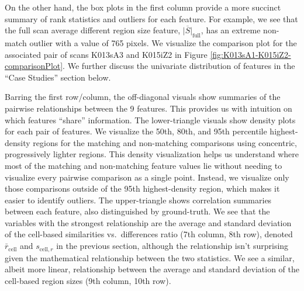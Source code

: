 \documentclass[11pt,]{isuthesis}
\begin{document}
On the other hand, the box plots in the first column provide a more succinct summary of rank statistics and outliers for each feature.
For example, we see that the full scan average different region size feature, \(\overline{|S|}_{\text{full}}\), has an extreme non-match outlier with a value of 765 pixels.
We visualize the comparison plot for the associated pair of scans K013sA3 and K015iZ2 in Figure \ref{fig:K013sA1-K015iZ2-comparisonPlot}.
We further discuss the univariate distribution of features in the ``Case Studies'' section below.

Barring the first row/column, the off-diagonal visuals show summaries of the pairwise relationships between the 9 features.
This provides us with intuition on which features ``share'' information.
The lower-triangle visuals show density plots for each pair of features.
We visualize the 50th, 80th, and 95th percentile highest-density regions for the matching and non-matching comparisons using concentric, progressively lighter regions.
This density visualization helps us understand where most of the matching and non-matching feature values lie without needing to visualize every pairwise comparison as a single point.
Instead, we visualize only those comparisons outside of the 95th highest-density region, which makes it easier to identify outliers.
The upper-triangle shows correlation summaries between each feature, also distinguished by ground-truth.
We see that the variables with the strongest relationship are the average and standard deviation of the cell-based similarities vs.~differences ratio (7th column, 8th row), denoted \(\bar{r}_{\text{cell}}\) and \(s_{\text{cell},r}\) in the previous section, although the relationship isn't surprising given the mathematical relationship between the two statistics.
We see a similar, albeit more linear, relationship between the average and standard deviation of the cell-based region sizes (9th column, 10th row).
\end{document}
